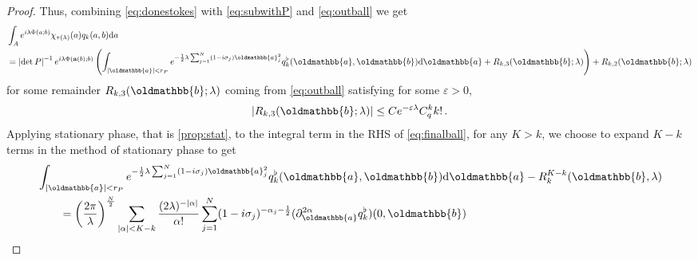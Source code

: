 \documentclass[
	fontsize=11pt, 
	twoside=false, 
	abstract=true, 
	a4paper,
]{scrartcl}
\newcommand{\eps}{\varepsilon}
\newcommand{\dd}{\mathrm{d}}
\newcommand{\abs}[1]{\left\lvert#1\right\rvert}
\newcommand{\del}{\partial}
\newcommand{\mf}[1]{\oldmathbb{#1}}
\begin{document}
\begin{proof}
	Thus, combining \cref{eq:donestokes} with \cref{eq:subwithP} and \cref{eq:outball} we get
	\begin{equation}\label{eq:finalball}
		\begin{aligned}
			&{} \int_A e^{i\lambda\Phi(a;b)}\chi_{\tau(\lambda)}(a) q_k(a,b)\dd a \\
			&=\abs{\det P}^{-1}e^{i\lambda \Phi(\mathbf{a}(b);b)}\left( \int_{\abs{\mf{a}} < r_P} e^{-\frac{1}{2}\lambda\sum_{j=1}^{N} (1-i\sigma_j)\mf{a}_j^2}q^\flat_{k}(\mf{a},\mf{b})\dd\mf{a}+ R_{k,3}(\mf{b};\lambda)\right) + R_{k,2}(\mf{b};\lambda)
		\end{aligned}
	\end{equation}
	for some remainder $R_{k,3}(\mf{b};\lambda)$ coming from %
	\cref{eq:outball} satisfying for some $\eps >0$,
	\[
		\abs{R_{k,3}(\mf{b};\lambda)} \leq Ce^{-\eps\lambda}C_q^kk!\,.	
	\]
%
%
	Applying stationary phase, that is \cref{prop:stat}, to the integral term in the RHS of \cref{eq:finalball}, for any $K > k$, we choose to expand $K-k$ terms in the method of stationary phase to get
	\begin{equation}
	\begin{aligned}\label{eq:inttosymb}
		&{}\int_{\abs{\mf{a}} < r_P} e^{-\frac{1}{2}\lambda\sum_{j=1}^{N} (1-i\sigma_j)\mf{a}_j^2}q^\flat_{k}(\mf{a},\mf{b})\dd\mf{a}- R_{k}^{K-k}(\mf{b},\lambda) \\ %
		&\qquad= \left(\frac{2\pi}{\lambda}\right)^{\frac{N}{2}}\sum_{\abs{\alpha}  < K-k}\frac{(2\lambda)^{-\abs{\alpha}}}{\alpha!}\sum_{j=1}^{N}(1-i\sigma_j)^{-\alpha_j-\frac{1}{2}}(\del_{\mf{a}}^{2\alpha} q^\flat_{k})(0,\mf{b}) %

\end{aligned}
\end{equation}
\end{proof}
\end{document}
